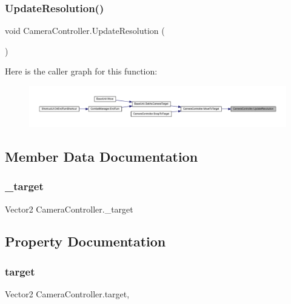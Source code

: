 \subsubsection{\texorpdfstring{UpdateResolution()}{UpdateResolution()}}
{\footnotesize\ttfamily void Camera\+Controller.\+Update\+Resolution (\begin{DoxyParamCaption}{ }\end{DoxyParamCaption})}

Here is the caller graph for this function\+:\nopagebreak
\begin{figure}[H]
\begin{center}
\leavevmode
\includegraphics[width=350pt]{class_camera_controller_a4894dc3111b871a8bf5ff422d30c1689_icgraph}
\end{center}
\end{figure}


\subsection{Member Data Documentation}
\mbox{\label{class_camera_controller_ac211a3ef97d78311cab3215e02dcaa8e}} 
\subsubsection{\texorpdfstring{\_target}{\_target}}
{\footnotesize\ttfamily Vector2 Camera\+Controller.\+\_\+target}



\subsection{Property Documentation}
\mbox{\label{class_camera_controller_a1557d6d0a4b70b6bb53f5a913329d0d0}} 
\subsubsection{\texorpdfstring{target}{target}}
{\footnotesize\ttfamily Vector2 Camera\+Controller.\+target\hspace{0.3cm}{\ttfamily [get]}, {\ttfamily [set]}}


